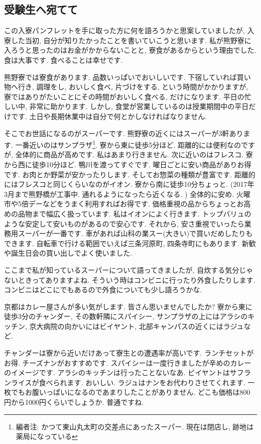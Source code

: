 \documentclass[10pt,b5jsbook,dvips,dvipdfmx,openany]{jsbook}
\theoremstyle{definition}
\begin{document}

		\subsection{受験生へ宛てて}
 
		この入寮パンフレットを手に取った方に何を語ろうかと思案していましたが, 入寮した当初, 自分が知りたかったことを書いていこうと思います. 
私が熊野寮に入ろうと思ったのはお金がかからないことと, 寮食があるからという理由でした. 食は大事です. 食べることは幸せです. 

		熊野寮では寮食があります. 品数いっぱいでおいしいです. 下宿していれば買い物へ行き, 調理をし, おいしく食べ, 片づけをする, という時間がかかりますが, 寮ではありがたいことにその時間がおいしく食べる, だけになります. 平日の忙しい中, 非常に助かります. しかし, 食堂が営業しているのは授業期間中の平日だけです. 土日や長期休業中は自分で何とかしなければなりません. 

		そこでお世話になるのがスーパーです. 熊野寮の近くにはスーパーが3軒あります. 一番近いのはサンプラザ\footnote{編者注: かつて東山丸太町の交差点にあったスーパー. 現在は閉店し, 跡地は薬局になっている}. 寮から東に徒歩5分ほど. 距離的には便利なのですが, 全体的に商品が高めです. 私はあまり行きません. 次に近いのはフレスコ. 寮から西に徒歩10分ほど. 鴨川を渡ってすぐです. 曜日ごとに安い商品がありお得です. お肉とか野菜が安かったりします. そしてお惣菜の種類が豊富です. 距離的にはフレスコと同じくらいなのがイオン. 寮から南に徒歩10分ちょっと. (2017年3月まで熊野橋が工事中. 通れるようになったら近くなる. ) 全体的に安め. 火曜市や5倍デーなどをうまく利用すればお得です. 価格重視の品からちょっとお高めの品物まで幅広く扱っています. 私はイオンによく行きます. トップバリュのような安定して安いものがあるので安心です. それから, 安さ重視でいったら業務用スーパーが一番です. 車があれば山科の業スー(大きい)で買いだめしたりもできます. 自転車で行ける範囲でいえば三条河原町, 四条寺町にもあります. 新歓や誕生日会の買い出しでよく使いました. 

		ここまで私が知っているスーパーについて語ってきましたが, 自炊する気分じゃないときってありますよね. そういう時はコンビニに行ったり外食したりします. コンビニはどこにでもあるので外食についても少し語ろうかな. 

		京都はカレー屋さんが多い気がします. 皆さん思いませんでしたか? 寮から東に徒歩3分のチャンダー, その数軒隣にスパイシー, サンプラザの上にはアラシのキッチン, 京大病院の向かいにはビイヤント, 北部キャンパスの近くにはラジュなど. 

		チャンダーは寮から近いだけあって寮生との遭遇率が高いです. ランチセットがお得. チーズナンがおすすめです. スパイシーは一度行きましたが辛めのカレーのイメージです. アラシのキッチンは行ったことないなあ. ビイヤントはサフランライスが食べられます. おいしい. ラジュはナンをお代わりさせてくれます. 一枚でもお腹いっぱいになるのであまりしたことがありません. どこも価格は800円から1000円くらいでしょうか. 普通ですね. 
\end{document}
